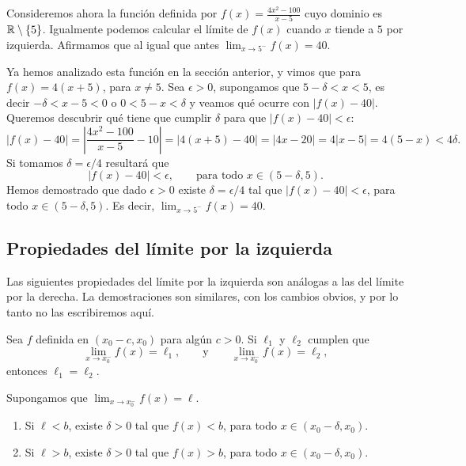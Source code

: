 \begin{example}
    Consideremos ahora la función definida por $f(x)=\frac{4x^2-100}{x-5}$ cuyo dominio es $\mathbb{R}\setminus\{5\}$.
    Igualmente podemos calcular el límite de $f(x)$ cuando $x$ tiende a $5$ por izquierda.
    Afirmamos que al igual que antes $\lim_{x\to 5^-} f(x) = 40$.

    Ya hemos analizado esta función en la sección anterior, y vimos que para $f(x)=4(x+5)$, para $x\neq 5$. 
    Sea $\epsilon > 0$, supongamos que $5-\delta<x<5$, es decir $-\delta < x-5<0$ o $0<5-x<\delta$ y veamos qué ocurre con $|f(x)-40|$. Queremos descubrir qué tiene que cumplir $\delta$ para que $|f(x)-40|<\epsilon$:
    \[
    |f(x)-40|=\left|\frac{4x^2-100}{x-5}-10\right|=|4(x+5)-40|=|4x-20|=4|x-5|=4(5-x)<4\delta.
    \]
    Si tomamos $\delta=\epsilon/4$ resultará que
    \[
    |f(x)-40| < \epsilon, \qquad\text{para todo $x \in (5-\delta,5)$}.
    \]
    Hemos demostrado que dado $\epsilon > 0$ existe $\delta=\epsilon/4$ tal que $|f(x)-40| < \epsilon$, para todo $x \in (5-\delta,5)$.
    Es decir, $\lim_{x\to 5^-} f(x) = 40$.
\end{example}

\subsection{Propiedades del límite por la izquierda}


Las siguientes propiedades del límite por la izquierda son análogas a las del límite por la derecha.
La demostraciones son similares, con los cambios obvios, y por lo tanto no las escribiremos aquí.

\begin{proposition}
    Sea $f$ definida en $(x_0-c,x_0)$ para algún $c>0$. Si $\ell_1$ y $\ell_2$ cumplen que
    \[
    \lim_{x\to x_0^-} f(x)=\ell_1, 
    \qquad \text{y}\qquad 
    \lim_{x\to x_0^-} f(x)=\ell_2,
    \]
    entonces $\ell_1=\ell_2$.
\end{proposition}

\begin{proposition}
    Supongamos que $\lim_{x\to x_0^-} f(x)=\ell$.
    \begin{enumerate}
        \item Si $\ell<b$, existe $\delta>0$ tal que $f(x)<b$, para todo $x\in(x_0-\delta,x_0)$.
        \item Si $\ell>b$, existe $\delta>0$ tal que $f(x)>b$, para todo $x\in(x_0-\delta,x_0)$.
    \end{enumerate}
\end{proposition}


